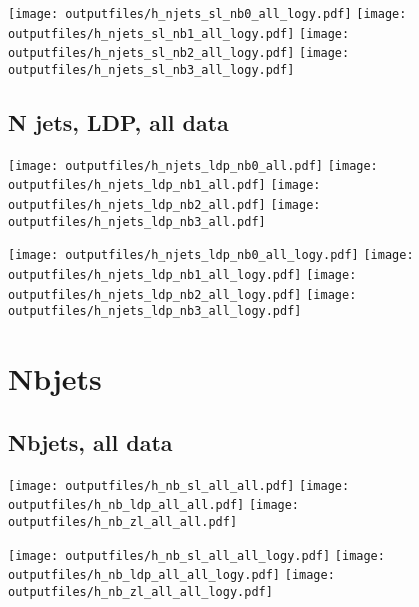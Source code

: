 \documentclass[11pt]{article}
\begin{document}
    \noindent
     \texttt{[image: outputfiles/h\_njets\_sl\_nb0\_all\_logy.pdf]}
     \texttt{[image: outputfiles/h\_njets\_sl\_nb1\_all\_logy.pdf]}
     \texttt{[image: outputfiles/h\_njets\_sl\_nb2\_all\_logy.pdf]}
     \texttt{[image: outputfiles/h\_njets\_sl\_nb3\_all\_logy.pdf]}

   \clearpage

    \subsection{ N jets, LDP, all data}

    \noindent
     \texttt{[image: outputfiles/h\_njets\_ldp\_nb0\_all.pdf]}
     \texttt{[image: outputfiles/h\_njets\_ldp\_nb1\_all.pdf]}
     \texttt{[image: outputfiles/h\_njets\_ldp\_nb2\_all.pdf]}
     \texttt{[image: outputfiles/h\_njets\_ldp\_nb3\_all.pdf]}

    \noindent
     \texttt{[image: outputfiles/h\_njets\_ldp\_nb0\_all\_logy.pdf]}
     \texttt{[image: outputfiles/h\_njets\_ldp\_nb1\_all\_logy.pdf]}
     \texttt{[image: outputfiles/h\_njets\_ldp\_nb2\_all\_logy.pdf]}
     \texttt{[image: outputfiles/h\_njets\_ldp\_nb3\_all\_logy.pdf]}

   \clearpage




    \clearpage
    \section{Nbjets}

    \subsection{ Nbjets, all data}

    \noindent
     \texttt{[image: outputfiles/h\_nb\_sl\_all\_all.pdf]}
     \texttt{[image: outputfiles/h\_nb\_ldp\_all\_all.pdf]}
     \texttt{[image: outputfiles/h\_nb\_zl\_all\_all.pdf]}

    \noindent
     \texttt{[image: outputfiles/h\_nb\_sl\_all\_all\_logy.pdf]}
     \texttt{[image: outputfiles/h\_nb\_ldp\_all\_all\_logy.pdf]}
     \texttt{[image: outputfiles/h\_nb\_zl\_all\_all\_logy.pdf]}
\end{document}
